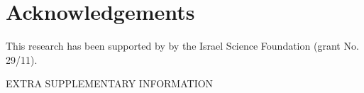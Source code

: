 \documentclass[aps,pre,floats,floatfix,twocolumn]{revtex4}
\newcommand{\Cn}[1]{\begin{center} #1 \end{center}}
\newcommand{\hidea}[1]{}    %
\begin{document}
\clearpage
{}
%



\section*{Acknowledgements}

This research has been supported by  by the Israel Science Foundation (grant No. 29/11).


\hidea{
\section*{Author contributions statement}

Both authors have contributed to this article. 

\section*{Additional information} 

The authors declare that they have no competing financial interests.
}





\clearpage
\appendix  
\onecolumngrid


\Cn{\LARGE EXTRA SUPPLEMENTARY INFORMATION}


\end{document}
